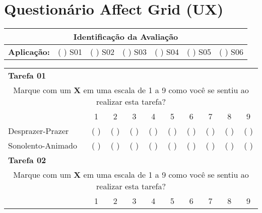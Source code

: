 \chapter{Questionário Affect Grid (UX)}
\label{sec:questionarioaffectgrid}
\begin{tabular}{lllllll}
\hline
\multicolumn{7}{|c|}{\textbf{Identificação da Avaliação}} \\ 
\hline
\multicolumn{1}{|l|}{\textbf{Aplicação:}} & \multicolumn{1}{l|}{(   ) S01} & \multicolumn{1}{l|}{(   ) S02} & \multicolumn{1}{l|}{(   ) S03} & \multicolumn{1}{l|}{(   ) S04} & \multicolumn{1}{l|}{(   ) S05} & \multicolumn{1}{l|}{(   ) S06} \\ 
\hline
\end{tabular}

\begin{table}[ht]
\centering
\begin{longtable}{llllllllll}
\multicolumn{10}{l}{\textbf{Tarefa 01}} \\ 
\multicolumn{10}{c}{Marque com um \textbf{X} em uma escala de 1 a 9 como você se sentiu ao realizar esta tarefa?} \\ 
\cline{2-10}
\multicolumn{1}{l|}{} & \multicolumn{1}{c|}{1} & \multicolumn{1}{c|}{2} & \multicolumn{1}{c|}{3} & \multicolumn{1}{c|}{4} & \multicolumn{1}{c|}{5} & \multicolumn{1}{c|}{6} & \multicolumn{1}{c|}{7} & \multicolumn{1}{c|}{8} & \multicolumn{1}{c|}{9} \\ 
\cline{2-10}
\multicolumn{1}{p{7.2cm}}{Desprazer-Prazer} & \multicolumn{1}{c}{( )} & \multicolumn{1}{c}{( )} & \multicolumn{1}{c}{( )} & \multicolumn{1}{c}{( )} & \multicolumn{1}{c}{( )} & \multicolumn{1}{c}{( )} & \multicolumn{1}{c}{( )} & \multicolumn{1}{c}{( )} & \multicolumn{1}{c}{( )} \\ 
\multicolumn{1}{p{7.2cm}}{Sonolento-Animado} & \multicolumn{1}{c}{( )} & \multicolumn{1}{c}{( )} & \multicolumn{1}{c}{( )} & \multicolumn{1}{c}{( )} & \multicolumn{1}{c}{( )} & \multicolumn{1}{c}{( )} & \multicolumn{1}{c}{( )} & \multicolumn{1}{c}{( )} & \multicolumn{1}{c}{( )} \\ 
\multicolumn{10}{l}{\textbf{Tarefa 02}} \\ 
\multicolumn{10}{c}{Marque com um \textbf{X} em uma escala de 1 a 9 como você se sentiu ao realizar esta tarefa?} \\ 
\cline{2-10}
\multicolumn{1}{l|}{} & \multicolumn{1}{c|}{1} & \multicolumn{1}{c|}{2} & \multicolumn{1}{c|}{3} & \multicolumn{1}{c|}{4} & \multicolumn{1}{c|}{5} & \multicolumn{1}{c|}{6} & \multicolumn{1}{c|}{7} & \multicolumn{1}{c|}{8} & \multicolumn{1}{c|}{9} \\ 

\end{longtable}
\end{table}
